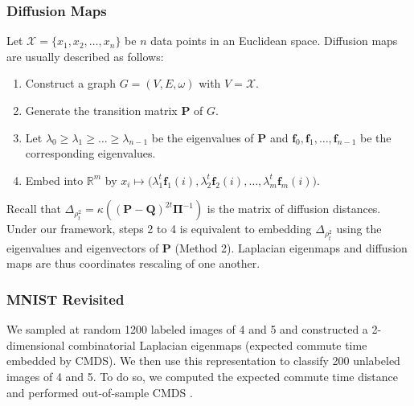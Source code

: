 \documentclass[professionalfonts, hyperref={pdfpagelabels=false,
  colorlinks=true, linkcolor=purple}]{beamer}
\begin{document}
\begin{frame}[label=diffusion_maps]
  \frametitle{Diffusion Maps}
    Let $\mathcal{X} = \{x_1,x_2,\dots,x_n\}$ be $n$ data points in an
    Euclidean space. Diffusion maps
    \cite{coifman06:_diffus_maps} are usually described as follows:
    \vskip10pt
  \begin{enumerate}
  \item Construct a graph $G = (V,E,\omega)$ with $V =
    \mathcal{X}$.
  \item Generate the transition matrix $\bm{P}$ of $G$.
  \item Let $\lambda_0 \geq \lambda_1 \geq \dots
    \geq \lambda_{n-1}$ be the eigenvalues of $\mathbf{P}$ and $\bm{f}_0, \bm{f}_1,
    \dots, \bm{f}_{n-1}$ be the corresponding eigenvalues.
  \item Embed into $\mathbb{R}^{m}$ by $x_i \mapsto \bigl(
    \lambda_{1}^{t} \bm{f}_{1}(i), \lambda_{2}^{t} \bm{f}_{2}(i),
    \dots, \lambda_{m}^{t} \bm{f}_{m}(i))$.
  \end{enumerate}
  \begin{alertblock}{}
    Recall that $\Delta_{\rho_t^2} = \kappa((\mathbf{P} -
    \mathbf{Q})^{2t}\bm{\Pi}^{-1})$ is the matrix of diffusion
    distances. Under our framework, steps 2 to 4 is equivalent to
    embedding $\Delta_{\rho_{t}^2}$ using the eigenvalues and
    eigenvectors of $\mathbf{P}$ (Method 2). Laplacian eigenmaps and
    diffusion maps are thus coordinates rescaling of one another.
  \end{alertblock}
\end{frame}

\begin{frame}[label=out_of_sample_mnist]
  \frametitle{MNIST Revisited}
  We sampled at random 1200 labeled images of 4 and 5
  and constructed a 2-dimensional combinatorial Laplacian eigenmaps
  (expected commute time embedded by CMDS). We then use this
  representation to classify 200 unlabeled images of 4 and 5. To do
  so, we computed the expected commute time distance and performed
  out-of-sample CMDS \cite{trosset08}.
  \begin{figure}[htbp]
    \begin{center}
      \hyperlink{fig:out_of_sample_mnist}{}
    \end{center}
  \end{figure}    
\end{frame}
\end{document}
